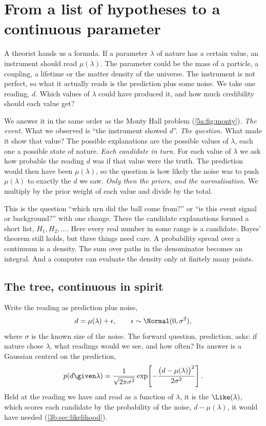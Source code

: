 \section{From a list of hypotheses to a continuous parameter}
\label{5b:sec:continuous}

A theorist hands us a formula. If a parameter $\lambda$ of nature has a certain value,
an instrument should read $\mu(\lambda)$. The parameter could be the mass of a
particle, a coupling, a lifetime or the matter density of the universe. The instrument
is not perfect, so what it actually reads is the prediction plus some noise. We take
one reading, $d$. Which values of $\lambda$ could have produced it, and how much
credibility should each value get?

We answer it in the same order as the Monty Hall problem (\cref{5a:fig:monty}).
\emph{The event.} What we observed is ``the instrument showed $d$''.
\emph{The question.} What made it show that value? The possible explanations are the
possible values of $\lambda$, each one a possible state of nature.
\emph{Each candidate in turn.} For each value of $\lambda$ we ask how probable the
reading $d$ was if that value were the truth. The prediction would then have been
$\mu(\lambda)$, so the question is how likely the noise was to push $\mu(\lambda)$ to
exactly the $d$ we saw.
\emph{Only then the priors, and the normalisation.} We multiply by the prior weight of
each value and divide by the total.

This is the question ``which urn did the ball come from?'' or ``is this event signal
or background?'' with one change. There the candidate explanations formed a short
list, $H_1,H_2,\dots$. Here every real number in some range is a candidate. Bayes'
theorem still holds, but three things need care. A probability spread over a continuum
is a density. The sum over paths in the denominator becomes an integral. And a computer
can evaluate the density only at finitely many points.

\subsection{The tree, continuous in spirit}

Write the reading as prediction plus noise,
\begin{equation}
  d=\mu(\lambda)+\epsilon,\qquad \epsilon\sim\Normal(0,\sigma^2),
  \label{5b:eq:model}
\end{equation}
where $\sigma$ is the known size of the noise. The forward question, prediction, asks:
if nature chose $\lambda$, what readings would we see, and how often? Its answer is a
Gaussian centred on the prediction,
\begin{equation}
  p(d\given\lambda)=\frac{1}{\sqrt{2\pi\sigma^2}}
  \exp\!\left[-\frac{\bigl(d-\mu(\lambda)\bigr)^2}{2\sigma^2}\right].
  \label{5b:eq:gauss-like}
\end{equation}
Held at the reading we have and read as a function of $\lambda$, it is the
 $\Like(\lambda)$, which scores each candidate by the
probability of the noise, $d-\mu(\lambda)$, it would have needed
(\cref{3b:sec:likelihood}).

